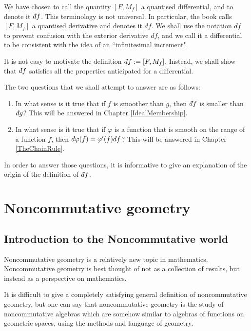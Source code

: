 \begin{remark}
    We have chosen to call the quantity $[F,M_f]$
    a quantised differential, and to denote it $\qd f$.     
    This terminology is not universal. In particular, the book \cite[Ch. 4]{Connes94}
    calls $[F,M_f]$ a quantised derivative and denotes it $df$.     
    We shall use the notation $\qd f$ to prevent confusion with the exterior
    derivative $df$, and we call it a differential to be consistent
    with the idea of an ``infinitesimal increment".
\end{remark}    



It is not easy to motivate the definition 
$\qd f := [F,M_f]$. Instead,
we shall show that $\qd f$ satisfies all the properties
anticipated for a differential. 

The two questions that we shall attempt to answer are as follows:
\begin{enumerate}
    \item{} In what sense is it true that if $f$ is smoother than $g$, then $\qd f$
    is smaller than $\qd g$? This will be answered in Chapter \ref{IdealMembership}.
    \item{} In what sense is it true that if $\varphi$ is a function that is smooth
    on the range of a function $f$, then $\qd \varphi(f) = \varphi'(f)\qd f$? This
    will be answered in Chapter \ref{TheChainRule}.
\end{enumerate}

In order to answer those questions, it is informative to give an explanation
of the origin of the definition of $\qd f$. 

\section{Noncommutative geometry}

\subsection{Introduction to the Noncommutative world}
Noncommutative geometry is a relatively new topic in mathematics. Noncommutative
geometry is best thought of not as a collection of results, but instead as a
perspective on mathematics.

It is difficult to give a completely satisfying general definition of noncommutative geometry, but 
one can say that noncommutative geometry is the study of noncommutative algebras
which are somehow similar to algebras of functions on geometric spaces, using
the methods and language of geometry.

